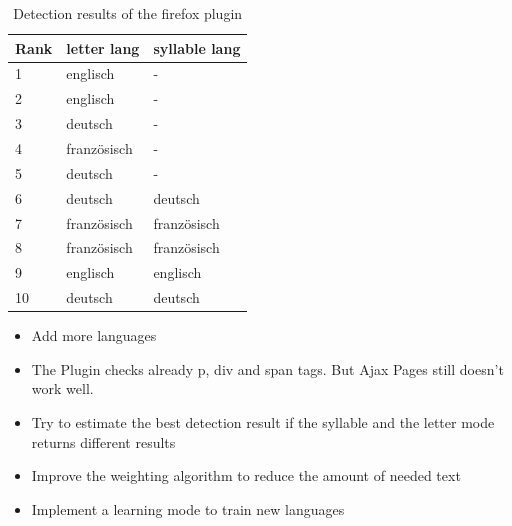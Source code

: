\begin{frame}[c]

\begin{table}
\begin{tabular}{|l|l|l|}
\hline
\textbf{Rank} &\textbf{letter lang}&\textbf{syllable lang}\\
\hline
1 &englisch&-\\
2 &englisch&-\\
3&deutsch&-\\
4&französisch&-\\
5&deutsch&-\\
6&deutsch&deutsch\\
7&französisch&französisch\\
8&französisch&französisch\\
9&englisch&englisch\\
10&deutsch&deutsch\\
\hline
\end{tabular}
\caption{Detection results of the firefox plugin}
\label{tablelabel}
\end{table}

\end{frame}

\begin{frame}[c]
	
	\begin{itemize}
	\begin{itemize}
		\item Add more languages
	\end{itemize}
	
	  \begin{itemize}
  	    \item The Plugin checks already p, div and span tags. But Ajax Pages
  	    still doesn't work well.
  	    \item Try to estimate the best detection result if the syllable and the
  	letter mode returns different results
      \end{itemize}
      \begin{itemize}
  		\item Improve the weighting algorithm to reduce the amount of needed text
  		\item Implement a learning mode to train new languages

	\end{itemize}
	\end{itemize}
\end{frame}